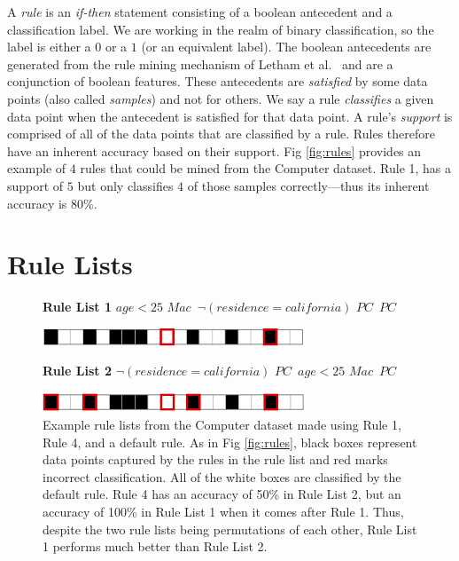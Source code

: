 A \textit{rule} is an \emph{if-then} statement consisting of a boolean antecedent and a classification label.
We are working in the realm of binary classification, so the label is either a $0$ or a $1$ (or an equivalent label).
The boolean antecedents are generated from the rule mining mechanism of Letham et al.~\cite{LethamRuMcMa15} and are a conjunction of boolean features.
These antecedents are \textit{satisfied} by some data points (also called \textit{samples}) and not for others.
We say a rule \textit{classifies} a given data point when the antecedent is satisfied for that data point.
A rule's \textit{support} is comprised of all of the data points that are classified by a rule.
Rules therefore have an inherent accuracy based on their support.
Fig \ref{fig:rules} provides an example of $4$ rules that could be mined from the Computer dataset.
Rule 1, has a support of $5$ but only classifies $4$ of those samples correctly---thus its inherent accuracy is $80$\%.

\section{Rule Lists}

\begin{figure}[t!]
\begin{algorithmic}
\normalsize

\State \textbf{Rule List 1}
\State \bif $age < 25$ \bthen $Mac$\,
\State \belif $\neg (residence=california)$ \bthen $PC$\,
\State \belse $PC$

\begin{raggedleft}
\vspace{1mm}
\includegraphics[width=0.7\textwidth]{figs/rule_list_1_cap.png}
\end{raggedleft}
\State \textbf{Rule List 2}
\State \bif $\neg (residence=california)$ \bthen $PC$\,
\State \belif $age < 25$ \bthen $Mac$\,
\State \belse $PC$

\begin{raggedleft}
\includegraphics[width=0.7\textwidth]{figs/rule_list_2_cap.png}
\end{raggedleft}

\end{algorithmic}
\caption{Example rule lists from the Computer dataset made using Rule 1, Rule 4, and a default rule.
As in Fig \ref{fig:rules}, black boxes represent data points captured by the rules in the rule list and red marks incorrect classification.
All of the white boxes are classified by the default rule.
Rule 4 has an accuracy of 50\% in Rule List 2, but an accuracy of 100\% in Rule List 1 when it comes after Rule 1.
Thus, despite the two rule lists being permutations of each other, Rule List 1 performs much better than Rule List 2.}
\label{fig:rule-list-computer}
\end{figure}

